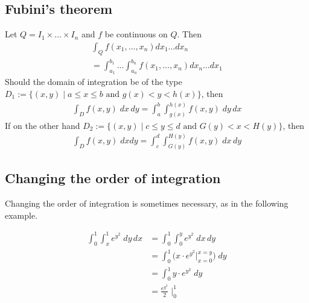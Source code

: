 \documentclass[8pt]{extarticle}
\newcommand{\R}{{\mathbb R}}
\def\R{\mathbf{R}}
\begin{document}
\begin{multicols*}{3}
  \subsection{Fubini's theorem}
  Let $Q = I_1 \times \dots \times I_n$ and $f$ be continuous on $Q$. Then
  \begin{align*}
    \int_Q f(x_1, \dots, x_n) dx_1 \dots dx_n \\
    =  \int_{a_1}^{b_1} \dots \int_{a_n}^{b_n} f(x_1, \dots, x_n) dx_n \dots dx_1
  \end{align*}
  Should the domain of integration be of the type $D_1 := \{ (x, y) \;|\; a \leq x \leq b \text{ and } g(x) < y < h(x) \}$,
  then
  \begin{align*}
    \int_D f(x, y) \; dx \, dy = \int_a^b \int_{g(x)}^{h(x)} f(x, y) \; dy \, dx
  \end{align*}
  If on the other hand $D_2 := \{(x, y) \;|\; c \leq y \leq d \text{ and } G(y) < x < H(y)\}$,
  then
  \begin{align*}
    \int_D f(x, y) \; dx dy = \int_c^d \int_{G(y)}^{H(y)} f(x, y) \; dx \, dy
  \end{align*}
  \subsection{Changing the order of integration}
  Changing the order of integration is sometimes necessary,
  as in the following example.
\begin{tcolorbox}[colback=blue!5!white,colframe=blue!75!black]

  \begin{align*}
    \int_0^1 \int_x^1 e^{y^2} \; dy \, dx
     & = \int_0^1 \int_0^y e^{y^2} \; dx \, dy                             \\
     & = \int_0^1 \Big( x \cdot e^{y^2} \Big |_{x = 0}^{x = y} \Big) \; dy \\
     & = \int_0^1 y \cdot e^{y^2} \; dy                                    \\
     & = \frac{e^{y^2}}{2} \; \Big |_0^1
  \end{align*}
\end{tcolorbox}

\end{multicols*}
\end{document}
